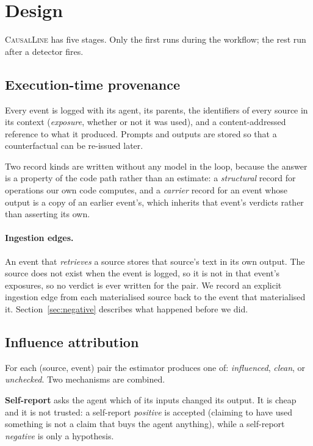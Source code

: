 \documentclass[10pt,twocolumn]{article}
\newcommand{\sys}{\textsc{CausalLine}}
\begin{document}
\section{Design}
\label{sec:design}

\sys{} has five stages. Only the first runs during the workflow; the rest run
after a detector fires.

\subsection{Execution-time provenance}

Every event is logged with its agent, its parents, the identifiers of every
source in its context (\emph{exposure}, whether or not it was used), and a
content-addressed reference to what it produced. Prompts and outputs are
stored so that a counterfactual can be re-issued later.

Two record kinds are written without any model in the loop, because the
answer is a property of the code path rather than an estimate: a
\emph{structural} record for operations our own code computes, and a
\emph{carrier} record for an event whose output is a copy of an earlier
event's, which inherits that event's verdicts rather than asserting its own.

\paragraph{Ingestion edges.}
An event that \emph{retrieves} a source stores that source's text in its own
output. The source does not exist when the event is logged, so it is not in
that event's exposures, so no verdict is ever written for the pair. We record
an explicit ingestion edge from each materialised source back to the event
that materialised it. Section~\ref{sec:negative} describes what happened
before we did.

\subsection{Influence attribution}
\label{sec:attribution}

For each (source, event) pair the estimator produces one of: \emph{influenced},
\emph{clean}, or \emph{unchecked}. Two mechanisms are combined.

\textbf{Self-report} asks the agent which of its inputs changed its output. It
is cheap and it is not trusted: a self-report \emph{positive} is accepted
(claiming to have used something is not a claim that buys the agent anything),
while a self-report \emph{negative} is only a hypothesis.
\end{document}
